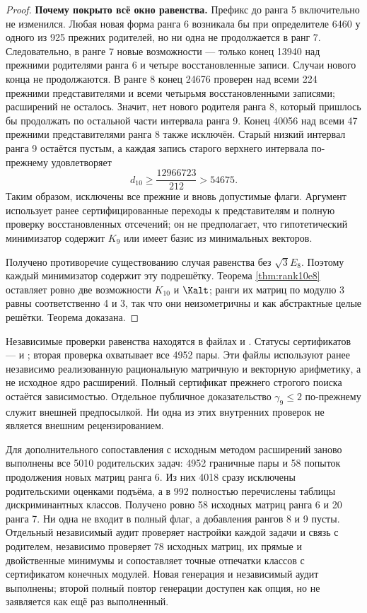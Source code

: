 \begin{proof}
\textbf{Почему покрыто всё окно равенства.}
Префикс до ранга 5 включительно не изменился. Любая новая форма ранга 6 возникала бы при определителе 6460 у одного из 925 прежних родителей, но ни одна не продолжается в ранг 7. Следовательно, в ранге 7 новые возможности --- только конец 13940 над прежними родителями ранга 6 и четыре восстановленные записи. Случаи нового конца не продолжаются. В ранге 8 конец 24676 проверен над всеми 224 прежними представителями и всеми четырьмя восстановленными записями; расширений не осталось. Значит, нет нового родителя ранга 8, который пришлось бы продолжать по остальной части интервала ранга 9. Конец 40056 над всеми 47 прежними представителями ранга 8 также исключён. Старый низкий интервал ранга 9 остаётся пустым, а каждая запись старого верхнего интервала по-прежнему удовлетворяет
\[
d_{10}\ge\frac{12966723}{212}>54675.
\]
Таким образом, исключены все прежние и вновь допустимые флаги. Аргумент использует ранее сертифицированные переходы к представителям и полную проверку восстановленных отсечений; он не предполагает, что гипотетический минимизатор содержит $K_9$ или имеет базис из минимальных векторов.

Получено противоречие существованию случая равенства без $\sqrt3E_8$. Поэтому каждый минимизатор содержит эту подрешётку. Теорема \ref{thm:rank10e8} оставляет ровно две возможности $K_{10}$ и $\Kalt$; ранги их матриц по модулю 3 равны соответственно 4 и 3, так что они неизометричны и как абстрактные целые решётки. Теорема доказана.
\end{proof}

Независимые проверки равенства находятся в файлах  и . Статусы сертификатов ---  и ; вторая проверка охватывает все 4952 пары. Эти файлы используют ранее независимо реализованную рациональную матричную и векторную арифметику, а не исходное ядро расширений. Полный сертификат прежнего строгого поиска остаётся зависимостью. Отдельное публичное доказательство $\gamma_9\le2$ по-прежнему служит внешней предпосылкой. Ни одна из этих внутренних проверок не является внешним рецензированием.

Для дополнительного сопоставления с исходным методом расширений заново выполнены все 5010 родительских задач: 4952 граничные пары и 58 попыток продолжения новых матриц ранга 6. Из них 4018 сразу исключены родительскими оценками подъёма, а в 992 полностью перечислены таблицы дискриминантных классов. Получено ровно 58 исходных матриц ранга 6 и 20 ранга 7. Ни одна не входит в полный флаг, а добавления рангов 8 и 9 пусты. Отдельный независимый аудит проверяет настройки каждой задачи и связь с родителем, независимо проверяет 78 исходных матриц, их прямые и двойственные минимумы и сопоставляет точные отпечатки классов с сертификатом конечных модулей. Новая генерация и независимый аудит выполнены; второй полный повтор генерации доступен как опция, но не заявляется как ещё раз выполненный.


